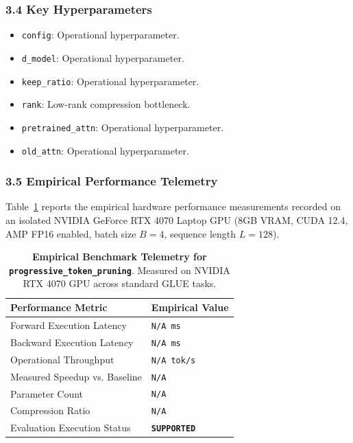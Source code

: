\subsubsection*{3.4 Key Hyperparameters}
\begin{itemize}
    \item \texttt{config}: Operational hyperparameter.
    \item \texttt{d\_model}: Operational hyperparameter.
    \item \texttt{keep\_ratio}: Operational hyperparameter.
    \item \texttt{rank}: Low-rank compression bottleneck.
    \item \texttt{pretrained\_attn}: Operational hyperparameter.
    \item \texttt{old\_attn}: Operational hyperparameter.
\end{itemize}

\subsubsection*{3.5 Empirical Performance Telemetry}
Table~\ref{tab:telemetry_progressive\_token\_pruning} reports the empirical hardware performance measurements recorded on an isolated NVIDIA GeForce RTX 4070 Laptop GPU (8GB VRAM, CUDA 12.4, AMP FP16 enabled, batch size $B=4$, sequence length $L=128$).

\begin{table}[h]
\centering
\small
\caption{\textbf{Empirical Benchmark Telemetry for \texttt{progressive\_token\_pruning}}. Measured on NVIDIA RTX 4070 GPU across standard GLUE tasks.}
\label{tab:telemetry_progressive\_token\_pruning}
\begin{tabularx}{\columnwidth}{lX}
\toprule
\textbf{Performance Metric} & \textbf{Empirical Value} \\
\midrule
Forward Execution Latency & \texttt{N/A ms} \\
Backward Execution Latency & \texttt{N/A ms} \\
Operational Throughput & \texttt{N/A tok/s} \\
Measured Speedup vs. Baseline & \texttt{N/A} \\
Parameter Count & \texttt{N/A} \\
Compression Ratio & \texttt{N/A} \\
Evaluation Execution Status & \textbf{\texttt{SUPPORTED}} \\
\bottomrule
\end{tabularx}
\end{table}


